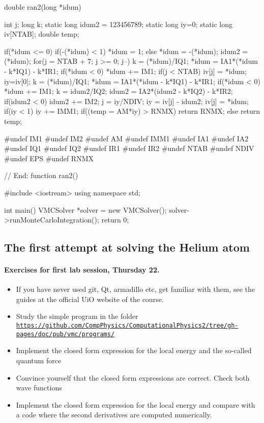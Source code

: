 \documentclass[%
twoside,                 %
final,                   %
10pt]{article}
\begin{document}
double ran2(long *idum)
{
  int            j;
  long           k;
  static long    idum2 = 123456789;
  static long    iy=0;
  static long    iv[NTAB];
  double         temp;

  if(*idum <= 0) {
    if(-(*idum) < 1) *idum = 1;
    else             *idum = -(*idum);
    idum2 = (*idum);
    for(j = NTAB + 7; j >= 0; j--) {
      k     = (*idum)/IQ1;
      *idum = IA1*(*idum - k*IQ1) - k*IR1;
      if(*idum < 0) *idum +=  IM1;
      if(j < NTAB)  iv[j]  = *idum;
    }
    iy=iv[0];
  }
  k     = (*idum)/IQ1;
  *idum = IA1*(*idum - k*IQ1) - k*IR1;
  if(*idum < 0) *idum += IM1;
  k     = idum2/IQ2;
  idum2 = IA2*(idum2 - k*IQ2) - k*IR2;
  if(idum2 < 0) idum2 += IM2;
  j     = iy/NDIV;
  iy    = iv[j] - idum2;
  iv[j] = *idum;
  if(iy < 1) iy += IMM1;
  if((temp = AM*iy) > RNMX) return RNMX;
  else return temp;
}
#undef IM1
#undef IM2
#undef AM
#undef IMM1
#undef IA1
#undef IA2
#undef IQ1
#undef IQ2
#undef IR1
#undef IR2
#undef NTAB
#undef NDIV
#undef EPS
#undef RNMX

// End: function ran2()


#include <iostream>
using namespace std;

int main()
{
    VMCSolver *solver = new VMCSolver();
    solver->runMonteCarloIntegration();
    return 0;
}
\ecppcod




\subsection{The first attempt at solving the Helium atom}

\paragraph{Exercises for first lab session, Thursday 22.}

\begin{itemize}
 \item If you have never used git, Qt, armadillo etc, get familiar with them, see the guides at the official UiO website of the course.

 \item Study the simple program in the folder \href{{https://github.com/CompPhysics/ComputationalPhysics2/tree/gh-pages/doc/pub/vmc/programs/}}{\nolinkurl{https://github.com/CompPhysics/ComputationalPhysics2/tree/gh-pages/doc/pub/vmc/programs/}}

 \item Implement the closed form expression for the local energy and the so-called quantum force

 \item Convince yourself that the closed form expressions are correct. Check both wave functions

 \item Implement the closed form expression for the local energy and compare with a code where the second derivatives are computed numerically.
\end{itemize}
\end{document}
